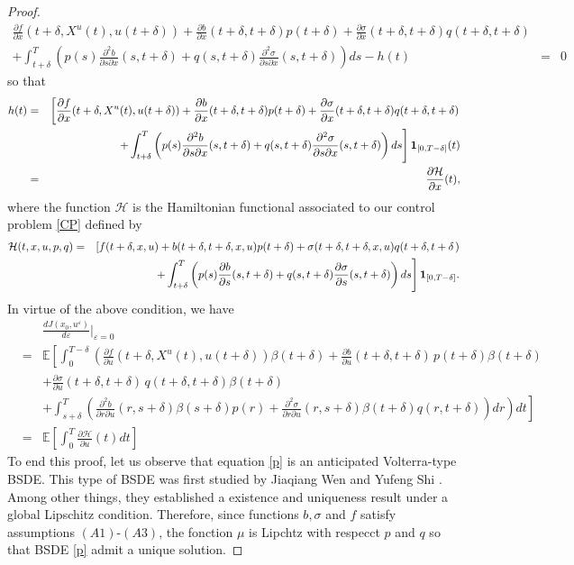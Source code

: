 \documentclass[12pt]{article}
\theoremstyle{remark}
\numberwithin{equation}{section}
\begin{document}
\begin{proof}
\begin{eqnarray*}
\frac{\partial f}{\partial x}(t+\delta,X^{u}(t),u(t+\delta)) 
			+ \frac{\partial b}{\partial x}(t+\delta,t+\delta)p(t+\delta)
			+ \frac{\partial \sigma}{\partial x}(t+\delta,t+\delta)q(t+\delta,t+\delta)\\
			+\int_{t+\delta}^{T}\left(p(s) \frac{\partial^2 b}{\partial s \partial x}(s,t+\delta)+q(s,t+\delta) \frac{\partial^2 \sigma}{\partial s \partial x}(s,t+\delta)\right)ds-h(t)	&=& 0 
\end{eqnarray*}
so that 
\begin{eqnarray*}
h(t)&=&\left[\frac{\partial f}{\partial x}(t+\delta,X^{u}(t),u(t+\delta)) + \frac{\partial b}{\partial x}(t+\delta,t+\delta)p(t+\delta)+ \frac{\partial \sigma}{\partial x}(t+\delta,t+\delta)q(t+\delta,t+\delta)\right.\\
&&\left.+\int_{t+\delta}^{T}\left(p(s) \frac{\partial^2 b}{\partial s \partial x}(s,t+\delta)+q(s,t+\delta) \frac{\partial^2 \sigma}{\partial s \partial x}(s,t+\delta)\right)ds\right]{\bf 1}_{[0,T-\delta]}(t)\\
&=& \frac{\partial \mathcal{H}}{\partial x}(t),
\end{eqnarray*}
where the function $\mathcal{H}$ is the Hamiltonian functional associated to our control problem \eqref{CP} defined by
\begin{eqnarray*}
\mathcal{H}(t,x,u,p,q)&=&\left[f(t+\delta,x,u)+b(t+\delta,t+\delta,x,u)p(t+\delta)+\sigma(t+\delta,t+\delta,x,u)q(t+\delta,t+\delta\right.)\\
	&&\left.+\int_{t+\delta}^T\left(p(s)\frac{\partial b}{\partial s}(s,t+\delta)+q(s,t+\delta)\frac{\partial \sigma}{\partial s}(s,t+\delta)\right)ds\right]{\bf 1}_{[0,T-\delta]}.
 \end{eqnarray*}
In virtue of the above condition, we have
\begin{eqnarray*}
&&\frac{dJ(x_0,u^{\varepsilon})}{d\varepsilon}|_{\varepsilon=0}\\
&=&\mathbb{E}\left[\int_{0}^{T-\delta}\left(\frac{\partial f}{\partial u}(t+\delta,X^{u}(t),u(t+\delta))\beta(t+\delta)+\frac{\partial b}{\partial u}(t+\delta, t+\delta)\,p(t+\delta)\beta(t+\delta)\right.\right.\\
&&\left.\left.+\frac{\partial \sigma}{\partial u}(t+\delta, t+\delta)\,q(t+\delta,t+\delta)\beta(t+\delta)\right.\right.\\
&&\left.\left.+\int_{s+\delta}^T\left(\frac{\partial^{2}b}{\partial r \partial u}(r, s+\delta)\beta(s+\delta)p(r)+\frac{\partial^{2}\sigma}{\partial r \partial u}(r, s+\delta)\beta(t+\delta)q(r,t+\delta)\right)dr\right)dt\right]\\
&=& \mathbb{E}\left[\int_{0}^{T}\frac{\partial \mathcal{H}}{\partial u}(t)dt\right]
\end{eqnarray*}
To end this proof, let us observe that equation \eqref{p} is an anticipated Volterra-type BSDE. This type of BSDE was first studied by Jiaqiang Wen and Yufeng Shi \cite{wen2017a}. Among other things, they established a existence and uniqueness result under a global Lipschitz condition. Therefore, since functions $b,\sigma$ and $f$ satisfy assumptions $(A1)$-$(A3)$, the fonction $\mu$ is Lipchtz with respecct $p$ and $q$ so that BSDE \eqref{p} admit a unique solution. 
\end{proof}
\end{document}
